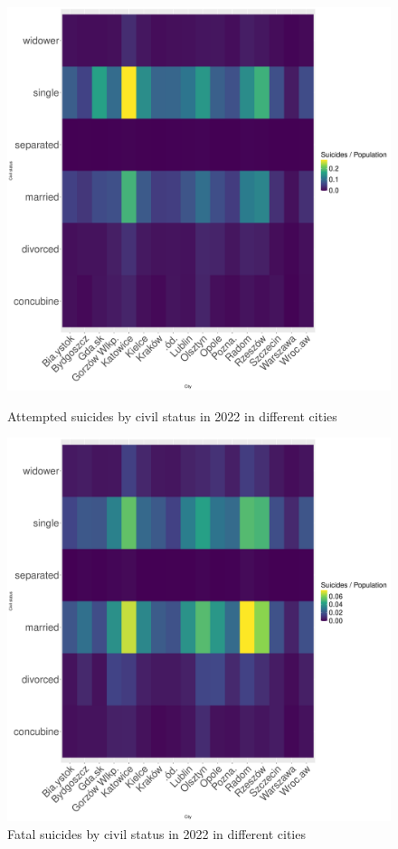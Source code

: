 \documentclass{article}
\begin{document}
\begin{figure}[H]
    \centering
    \begin{minipage}{0.45\textwidth}
        \includegraphics[width=\textwidth]{imgs/status_city_op-att-2022.pdf}
        \caption{Attempted suicides by civil status  in 2022 in different cities}
	\label{fig:status_city_op-att-2022}
    \end{minipage}
    \hfill
    \begin{minipage}{0.45\textwidth}
        \includegraphics[width=\textwidth]{imgs/status_city_op-fat-2022.pdf}
        \caption{Fatal suicides by civil status  in 2022 in different cities}
        \label{fig:status_city_op-fat-2022}
    \end{minipage}
\end{figure}
\end{document}
